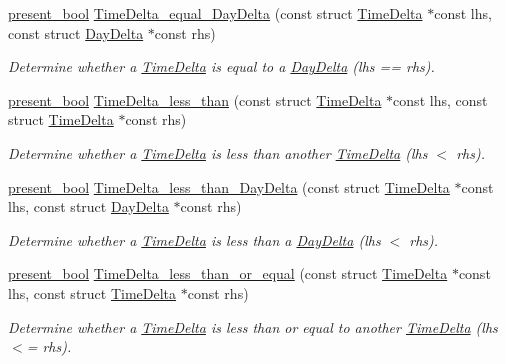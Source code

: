 \begin{DoxyCompactItemize}
\hyperlink{types_8h_a1c24e2cdd988b886e889080ded176ae0}{present\-\_\-bool} \hyperlink{time-delta_8h_a2008a3377ae857c9add7f268b9be62ff}{Time\-Delta\-\_\-equal\-\_\-\-Day\-Delta} (const struct \hyperlink{structTimeDelta}{Time\-Delta} $\ast$const lhs, const struct \hyperlink{structDayDelta}{Day\-Delta} $\ast$const rhs)
\begin{DoxyCompactList}\small\item\em Determine whether a \hyperlink{structTimeDelta}{Time\-Delta} is equal to a \hyperlink{structDayDelta}{Day\-Delta} (lhs == rhs). \end{DoxyCompactList}\item 
\hyperlink{types_8h_a1c24e2cdd988b886e889080ded176ae0}{present\-\_\-bool} \hyperlink{time-delta_8h_a17c72c9312884c0aabbfbcc6c195fa5e}{Time\-Delta\-\_\-less\-\_\-than} (const struct \hyperlink{structTimeDelta}{Time\-Delta} $\ast$const lhs, const struct \hyperlink{structTimeDelta}{Time\-Delta} $\ast$const rhs)
\begin{DoxyCompactList}\small\item\em Determine whether a \hyperlink{structTimeDelta}{Time\-Delta} is less than another \hyperlink{structTimeDelta}{Time\-Delta} (lhs $<$ rhs). \end{DoxyCompactList}\item 
\hyperlink{types_8h_a1c24e2cdd988b886e889080ded176ae0}{present\-\_\-bool} \hyperlink{time-delta_8h_a94e1bf9f7e4a6781afb6ebfd6de58ab8}{Time\-Delta\-\_\-less\-\_\-than\-\_\-\-Day\-Delta} (const struct \hyperlink{structTimeDelta}{Time\-Delta} $\ast$const lhs, const struct \hyperlink{structDayDelta}{Day\-Delta} $\ast$const rhs)
\begin{DoxyCompactList}\small\item\em Determine whether a \hyperlink{structTimeDelta}{Time\-Delta} is less than a \hyperlink{structDayDelta}{Day\-Delta} (lhs $<$ rhs). \end{DoxyCompactList}\item 
\hyperlink{types_8h_a1c24e2cdd988b886e889080ded176ae0}{present\-\_\-bool} \hyperlink{time-delta_8h_a719a2e8e64a3f680cff26b4d871a61d3}{Time\-Delta\-\_\-less\-\_\-than\-\_\-or\-\_\-equal} (const struct \hyperlink{structTimeDelta}{Time\-Delta} $\ast$const lhs, const struct \hyperlink{structTimeDelta}{Time\-Delta} $\ast$const rhs)
\begin{DoxyCompactList}\small\item\em Determine whether a \hyperlink{structTimeDelta}{Time\-Delta} is less than or equal to another \hyperlink{structTimeDelta}{Time\-Delta} (lhs $<$= rhs). \end{DoxyCompactList}\item 

\end{DoxyCompactItemize}
